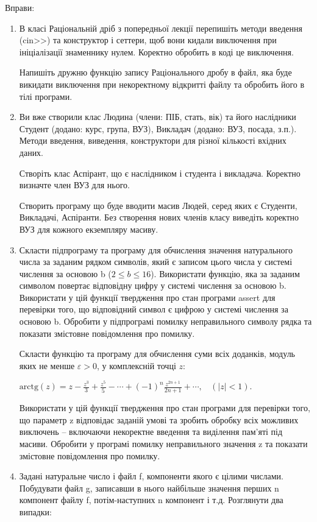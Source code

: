 \documentclass[]{article}
\begin{document}
Вправи:
\begin{enumerate}
\item
В класі Раціональній дріб з
попередньої лекції перепишіть методи введення
(cin\textgreater{}\textgreater{}) та конструктор і сеттери, щоб вони
кидали виключення при ініціалізації знаменнику нулем. Коректно обробить
в коді це виключення.

Напишіть дружню функцію запису Раціонального дробу в файл, яка буде
викидати виключення при некоректному відкритті файлу та обробить його в
тілі програми.
\item 
Ви вже створили клас Людина
(члени: ПІБ, стать, вік) та його наслідники Студент (додано: курс,
група, ВУЗ), Викладач (додано: ВУЗ, посада, з.п.). Методи введення,
виведення, конструктори для різної кількості вхідних даних.

Створіть клас Аспірант, що є наслідником і студента і викладача.
Коректно визначте член ВУЗ для нього.

Створить програму що буде вводити масив Людей, серед яких є Студенти,
Викладачі, Аспіранти. Без створення нових членів класу виведіть коректно
ВУЗ для кожного екземпляру масиву.

\item
Скласти підпрограму та програму
для обчислення значення натурального числа за заданим рядком символів,
який є записом цього числа у системі числення за основою b
(\(2 \leq b \leq 16\)). Використати функцію, яка за заданим символом
повертає відповідну цифру у системі числення за основою b. Використати у
цій функції твердження про стан програми assert для перевірки того, що
відповідний символ є цифрою у системі числення за основою b. Обробити у
підпрограмі помилку неправильного символу рядка та показати змістовне
повідомлення про помилку.

Скласти функцію та програму для обчислення суми всіх доданків, модуль
яких не менше $\varepsilon >0$, у комплексній точці $z$:

\(\text{arctg}\left( z \right) = z - \frac{z^{3}}{3} + \frac{z^{5}}{5} - \cdots + {( - 1)}^{n}\frac{z^{2n + 1}}{2n + 1} + \cdots,\ \ \ \ (\left| z \right| < 1)\).

Використати у цій функції твердження про стан програми для перевірки
того, що параметр z відповідає заданій умові та зробить обробку всіх
можливих виключень -- включаючи некоректне введення та виділення пам'яті
під масиви. Обробити у програмі помилку неправильного значення z та
показати змістовне повідомлення про помилку.

\item
Задані натуральне число і файл f, компоненти якого є цілими числами.
Побудувати файл g, записавши в нього найбільше значення перших n
компонент файлу f, потім-наступних n компонент і т.д. Розглянути два
випадки:


\end{enumerate}
\end{document}
